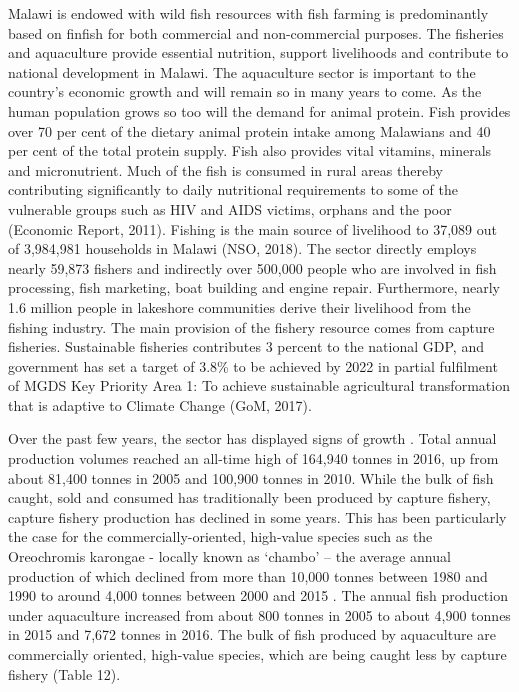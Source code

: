 \documentclass[
]{book}
\begin{document}
Malawi is endowed with wild fish resources with fish farming is predominantly based on finfish for both commercial and non-commercial purposes. The fisheries and aquaculture provide essential nutrition, support livelihoods and contribute to national development in Malawi. The aquaculture sector is important to the country's economic growth and will remain so in many years to come. As the human population grows so too will the demand for animal protein. Fish provides over 70 per cent of the dietary animal protein intake among Malawians and 40 per cent of the total protein supply. Fish also provides vital vitamins, minerals and micronutrient. Much of the fish is consumed in rural areas thereby contributing significantly to daily nutritional requirements to some of the vulnerable groups such as HIV and AIDS victims, orphans and the poor (Economic Report, 2011). Fishing is the main source of livelihood to 37,089 out of 3,984,981 households in Malawi (NSO, 2018). The sector directly employs nearly 59,873 fishers and indirectly over 500,000 people who are involved in fish processing, fish marketing, boat building and engine repair. Furthermore, nearly 1.6 million people in lakeshore communities derive their livelihood from the fishing industry. The main provision of the fishery resource comes from capture fisheries. Sustainable fisheries contributes 3 percent to the national GDP, and government has set a target of 3.8\% to be achieved by 2022 in partial fulfilment of MGDS Key Priority Area 1: To achieve sustainable agricultural transformation that is adaptive to Climate Change (GoM, 2017).

Over the past few years, the sector has displayed signs of growth . Total annual production volumes reached an all-time high of 164,940 tonnes in 2016, up from about 81,400 tonnes in 2005 and 100,900 tonnes in 2010. While the bulk of fish caught, sold and consumed has traditionally been produced by capture fishery, capture fishery production has declined in some years. This has been particularly the case for the commercially-oriented, high-value species such as the Oreochromis karongae - locally known as `chambo' -- the average annual production of which declined from more than 10,000 tonnes between 1980 and 1990 to around 4,000 tonnes between 2000 and 2015 . The annual fish production under aquaculture increased from about 800 tonnes in 2005 to about 4,900 tonnes in 2015 and 7,672 tonnes in 2016. The bulk of fish produced by aquaculture are commercially oriented, high-value species, which are being caught less by capture fishery (Table 12).
\end{document}
